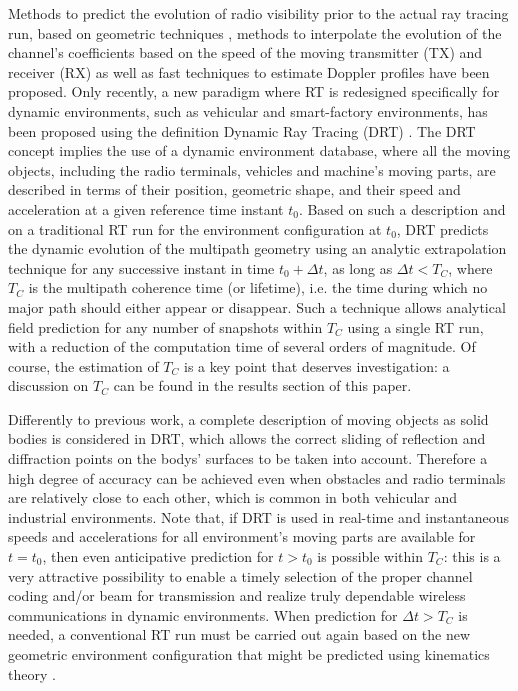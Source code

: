 Methods to predict the evolution of radio visibility prior to the actual ray tracing run, based on geometric techniques \cite{he2019,hussain2019}, methods to interpolate the evolution of the channel’s coefficients based on the speed of the moving transmitter (TX) and receiver (RX) \cite{nuckelt2015} as well as fast techniques to estimate Doppler profiles \cite{azpilicueta} have been proposed.   
Only recently, a new paradigm where RT is redesigned specifically for dynamic environments, such as vehicular and smart-factory environments, has been proposed using the definition Dynamic Ray Tracing (DRT) \cite{bilibashi,bilibashi2,qua}. The DRT concept implies the use of a dynamic environment database, where all the moving objects, including the radio terminals, vehicles and machine’s moving parts, are described in terms of their position, geometric shape, and their speed and acceleration at a given reference time instant $t_0$. Based on such a description and on a traditional RT run for the environment configuration at $t_0$, DRT predicts the dynamic evolution of the multipath geometry using an analytic extrapolation technique for any successive instant in time $t_{0}+\Delta t$, as long as $\Delta t < T_C$, where $T_C$ is the multipath coherence time (or lifetime), i.e. the time during which no major path should either appear or disappear.  Such a technique allows analytical field prediction for any number of snapshots within $T_C$ using a single RT run, with a reduction of the computation time of several orders of magnitude. Of course, the estimation of $T_C$ is a key point that deserves investigation: a discussion on $T_C$ can be found in the results section of this paper. 

Differently to previous work, a complete description of moving objects as solid bodies is considered in DRT, which allows the correct sliding of reflection and diffraction points on the bodys' surfaces to be taken into account. Therefore a high degree of accuracy can be achieved even when obstacles and radio terminals are relatively close to each other, which is common in both vehicular and industrial environments. Note that, if DRT is used in real-time and instantaneous speeds and accelerations for all environment’s moving parts are available for $t=t_0$, then even anticipative prediction for $t>t_0$ is possible within $T_C$: this is a very attractive possibility to enable a timely selection of the proper channel coding and/or beam for transmission and realize truly dependable wireless communications in dynamic environments.  When prediction for $\Delta t > T_C$ is needed, a conventional RT run must be carried out again based on the new geometric environment configuration that might be predicted using kinematics theory \cite{Martin1968,taylor2005}.

